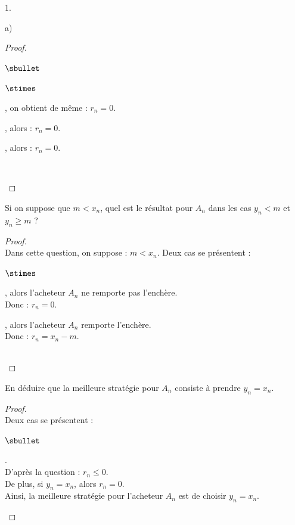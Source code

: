 \documentclass[11pt]{article}%
\begin{document}
\begin{noliste}{1.}
\begin{noliste}{a)}
\begin{proof}
\begin{noliste}{$\sbullet$}
\begin{noliste}{$\stimes$}
	  \item {}, on obtient de même : $r_n=0$.
	  
	  \item {}, alors : $r_n=0$.
	  
	  \item {}, alors : $r_n=0$.
	\end{noliste}
	~\\[-1.4cm]
      \end{noliste}
    \end{proof}

    
    \item Si on suppose que $m < x_n$, quel est le résultat pour $A_n$
    dans les cas $y_n < m$ et $y_n \geq m$ ?
    
    \begin{proof}~\\
      Dans cette question, on suppose : $m < x_n$. Deux cas se 
      présentent :
      \begin{noliste}{$\stimes$}
	\item {}, alors l'acheteur $A_n$ ne 
	remporte pas l'enchère. \\
	Donc : $r_n=0$.
	
	\item {}, alors l'acheteur $A_n$
	remporte l'enchère.\\
	Donc : $r_n= x_n-m$.
      \end{noliste}
      
      ~\\[-1.4cm]
    \end{proof}

    
    
    
    \item En déduire que la meilleure stratégie pour $A_n$ consiste 
    à prendre $y_n =x_n$.
    
    \begin{proof}~\\
      Deux cas se présentent :
      \begin{noliste}{$\sbullet$}
	\item {}.\\[.1cm]
	D'après la question  : $r_n \leq 0$.\\
	De plus, si $y_n = x_n$, alors $r_n=0$.\\
	Ainsi, la meilleure stratégie pour l'acheteur $A_n$ est de 
	choisir $y_n = x_n$.
	

\end{noliste}
\end{proof}
\end{noliste}
\end{noliste}
\end{document}
